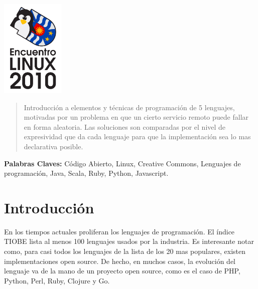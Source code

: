 \begin{minipage}{0.1in}
  \includegraphics[width=1.2in]{images/logo.png}
\end{minipage}
\hfill
\begin{minipage}{6in}
  \maketitle
\end{minipage}
\hfill
\begin{minipage}{7in}
\end{minipage}
  \thispagestyle{empty}

\begin{abstract}
  
  Introducción a elementos y técnicas de programación de 5 lenguajes, motivadas
  por un problema en que un cierto servicio remoto puede fallar en forma
  aleatoria. Las soluciones son comparadas por el nivel de expresividad que da
  cada lenguaje para que la implementación sea lo mas declarativa posible.

\end{abstract}

\textbf{Palabras Claves:} Código Abierto, Linux, Creative Commons, Lenguajes de
programación, Java, Scala, Ruby, Python, Javascript.

\section*{Introducción}

En los tiempos actuales proliferan los lenguajes de programación. El índice
TIOBE\cite{TIOBE} lista al menos 100 lenguajes usados por la industria. Es
interesante notar como, para casi todos los lenguajes de la lista de los 20 mas
populares, existen implementaciones open source. De hecho, en muchos casos, la
evolución del lenguaje va de la mano de un proyecto open source, como es el caso
de PHP, Python, Perl, Ruby, Clojure y Go.

